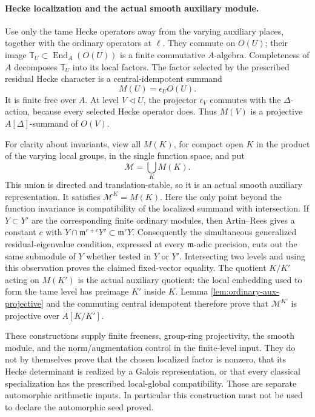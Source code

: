 \paragraph{Hecke localization and the actual smooth auxiliary module.}
Use only the tame Hecke operators away from the varying auxiliary
places, together with the ordinary operators at \(\ell\).
They commute on \(O(U)\); their image
\(\mathbb T_U\subset\operatorname{End}_A(O(U))\) is a finite commutative
\(A\)-algebra.  Completeness of \(A\) decomposes \(\mathbb T_U\) into
its local factors.  The factor selected by the prescribed residual
Hecke character is a central-idempotent summand
\[
 M(U)=\epsilon_UO(U).
 \tag{OC14}
\]
It is finite free over \(A\).  At level \(V\triangleleft U\), the
projector \(\epsilon_V\) commutes with the \(\Delta\)-action, because
every selected Hecke operator does.  Thus \(M(V)\) is a projective
\(A[\Delta]\)-summand of \(O(V)\).

For clarity about invariants, view all \(M(K)\), for compact open
\(K\) in the product of the varying local groups, in the single
function space, and put
\[
 \mathcal M=\bigcup_KM(K).
 \tag{OC15}
\]
This union is directed and translation-stable, so it is an actual
smooth auxiliary representation.  It satisfies
\(\mathcal M^K=M(K)\).
Here the only point beyond the function invariance is compatibility
of the localized summand with intersection.  If \(Y\subset Y'\) are
the corresponding finite ordinary modules, then Artin--Rees gives a
constant \(c\) with
\(Y\cap\mathfrak m^{r+c}Y'\subset\mathfrak m^rY\).
Consequently the simultaneous generalized residual-eigenvalue
condition, expressed at every \(\mathfrak m\)-adic precision, cuts out
the same submodule of \(Y\) whether tested in \(Y\) or \(Y'\).
Intersecting two levels and using this observation proves the claimed
fixed-vector equality.
The quotient \(K/K'\) acting on \(M(K')\) is the actual auxiliary
quotient: the local embedding used to form the tame level has
preimage \(K'\) inside \(K\).  Lemma
\ref{lem:ordinary-aux-projective} and the commuting central idempotent
therefore prove that \(\mathcal M^{K'}\) is projective over
\(A[K/K']\).

These constructions supply finite freeness, group-ring projectivity,
the smooth module, and the norm/augmentation control in the
finite-level input.  They do not by themselves prove that the chosen
localized factor is nonzero, that its Hecke determinant is realized
by a Galois representation, or that every classical specialization
has the prescribed local-global compatibility.  Those are separate
automorphic arithmetic inputs.  In particular this construction must
not be used to declare the automorphic seed proved.

